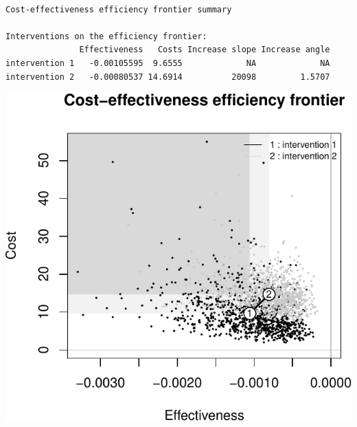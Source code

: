 \documentclass[]{article}
\newenvironment{Shaded}{\begin{snugshade}}{\end{snugshade}}
\newcommand{\ControlFlowTok}[1]{\textcolor[rgb]{0.13,0.29,0.53}{\textbf{#1}}}
\newcommand{\DataTypeTok}[1]{\textcolor[rgb]{0.13,0.29,0.53}{#1}}
\newcommand{\DecValTok}[1]{\textcolor[rgb]{0.00,0.00,0.81}{#1}}
\newcommand{\KeywordTok}[1]{\textcolor[rgb]{0.13,0.29,0.53}{\textbf{#1}}}
\newcommand{\NormalTok}[1]{#1}
\newcommand{\OperatorTok}[1]{\textcolor[rgb]{0.81,0.36,0.00}{\textbf{#1}}}
\newcommand{\OtherTok}[1]{\textcolor[rgb]{0.56,0.35,0.01}{#1}}
\newcommand{\StringTok}[1]{\textcolor[rgb]{0.31,0.60,0.02}{#1}}
\begin{document}
\begin{Shaded}
\end{Shaded}

\begin{verbatim}

Cost-effectiveness efficiency frontier summary 

Interventions on the efficiency frontier:
               Effectiveness   Costs Increase slope Increase angle
intervention 1   -0.00105595  9.6555             NA             NA
intervention 2   -0.00080537 14.6914          20098         1.5707
\end{verbatim}

\begin{center}\includegraphics{report_files/figure-latex/unnamed-chunk-7-1} \end{center}
\end{document}
